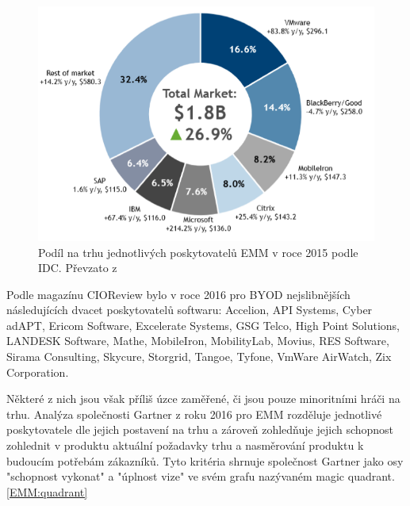   \begin{figure}[h!]
\includegraphics[width=13cm]{img/IDC2016}
\caption{Podíl na trhu jednotlivých poskytovatelů EMM v roce 2015 podle IDC. Převzato z \cite{IDC0}} 
\label{EMM:podil2016}
\centering
\end{figure}%

Podle magazínu CIOReview \cite{CIOReview} bylo v roce 2016 pro BYOD nejslibnějších následujících dvacet poskytovatelů softwaru: Accelion, API Systems, Cyber adAPT, Ericom Software, Excelerate Systems, GSG Telco, High Point Solutions, LANDESK Software,  Mathe, MobileIron, MobilityLab, Movius, RES Software, Sirama Consulting, Skycure, Storgrid, Tangoe, Tyfone, VmWare AirWatch, Zix Corporation.

Některé z nich jsou však příliš úzce zaměřené, či jsou pouze minoritními hráči na trhu. Analýza společnosti Gartner \cite{Gartner_EMM_2016} z roku 2016 pro EMM rozděluje jednotlivé poskytovatele dle jejich postavení na trhu a zároveň zohledňuje jejich schopnost zohlednit v produktu aktuální požadavky trhu a nasměrování produktu k budoucím potřebám zákazníků. Tyto kritéria shrnuje společnost Gartner jako osy "schopnost vykonat" a "úplnost vize" ve svém grafu nazývaném magic quadrant. \ref{EMM:quadrant}



